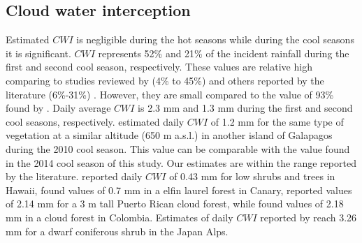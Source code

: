 \documentclass[a4paper,12pt]{article}
\begin{document}
\begin{linenumbers}
\subsection{Cloud water interception}
Estimated $CWI$ is negligible during the hot seasons while during the cool seasons it is significant. $CWI$ represents 52\% and 21\% of the incident rainfall during the first and second cool season, respectively. These values are relative high comparing to studies reviewed by \cite{Bruijnzeeletal2011} (4\% to 45\%) and others reported by the literature (6\%-31\%) \citep{Hutleyetal1997, Holwerdaetal2006, McJannetetal2007a, Holwerdaetal2010, Ueharaetal2012}. However, they are small compared to the value of 93\% found by \cite{CavalierandGoldstein1989}. Daily average $CWI$ is 2.3 mm and 1.3 mm during the first and second cool seasons, respectively. \cite{Pryetetal2012a} estimated daily $CWI$ of 1.2 mm for the same type of vegetation at a similar altitude (650 m a.s.l.) in another island of Galapagos during the 2010 cool season. This value can be comparable with the value found in the 2014 cool season of this study. Our estimates are within the range reported by the literature. \cite{Giambellucaetal2011} reported daily $CWI$ of 0.43 mm for low shrubs and trees in Hawaii, \cite{Ritteretal2008} found values of 0.7 mm in a elfin laurel forest in Canary, \cite{Holwerdaetal2006} reported values of 2.14 mm for a 3 m tall Puerto Rican cloud forest, while \cite{CavalierandGoldstein1989} found values of 2.18 mm in a cloud forest in Colombia. Estimates of daily $CWI$ reported by \cite{Ueharaetal2012} reach 3.26 mm for a dwarf coniferous shrub in the Japan Alps.


\end{linenumbers}
\end{document}
